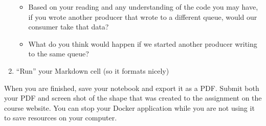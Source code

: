 \documentclass[letterpaper,10pt]{article}
\begin{document}
\begin{enumerate}
\begin{itemize}
			\item Based on your reading and any understanding of the code you may have, if you wrote another producer that wrote to a different queue, would our consumer take that data?
			\item What do you think would happen if we started another producer writing to the same queue?
		\end{itemize}
	\item ``Run'' your Markdown cell (so it formats nicely)
\end{enumerate}
When you are finished, save your notebook and export it as a PDF. Submit both your PDF and screen shot of the shape that was created to the assignment on the course website.
You can stop your Docker application while you are not using it to save resources on your computer.
\end{document}
